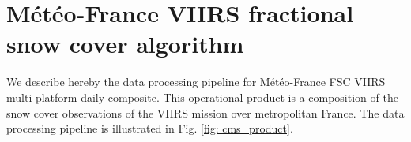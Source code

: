 \documentclass[tc, manuscript]{copernicus}
\begin{document}





\clearpage 

\appendix
\section{Météo-France VIIRS fractional snow cover algorithm}
\label{app: mf_product}

We describe hereby the data processing pipeline for Météo-France FSC VIIRS multi-platform daily composite. This operational product is a composition of the snow cover observations of the VIIRS mission over metropolitan France. The data processing pipeline is illustrated in Fig. \ref{fig: cms_product}.
\end{document}
